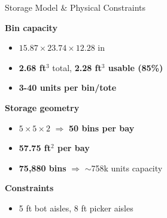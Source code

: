 \documentclass[aspectratio=169, 12pt]{beamer}
\newcommand{\kpi}[1]{\textbf{\color{dhlRed}#1}}
\begin{document}
\begin{frame}{Storage Model \& Physical Constraints}

\footnotesize

\textbf{Bin capacity}
\vspace{0.1em}
\begin{itemize}\setlength{\itemsep}{0.1em}
  \item $15.87 \times 23.74 \times 12.28$ in
  \item \textbf{2.68 ft$^3$} total, \textbf{2.28 ft$^3$ usable (85\%)}
  \item \kpi{3-40 units per bin/tote}
\end{itemize}

\vspace{0.2em}

\textbf{Storage geometry}
\vspace{0.1em}
\begin{itemize}\setlength{\itemsep}{0.1em}
  \item $5 \times 5 \times 2$ $\Rightarrow $ \kpi{50 bins per bay}
  \item \kpi{57.75 ft$^2$ per bay}
  \item \kpi{75,880 bins} $\Rightarrow$ $\sim$758k units capacity
\end{itemize}

\vspace{0.2em}

\textbf{Constraints}
\vspace{0.1em}
\begin{itemize}\setlength{\itemsep}{0.1em}
  \item 5 ft bot aisles, 8 ft picker aisles
\end{itemize}

\end{frame}
\end{document}
